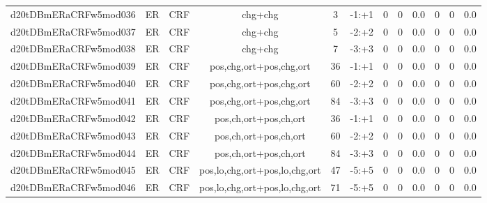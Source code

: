 \documentclass[a4paper]{article}
\begin{document}
\begin{landscape}
\begin{center}
\begin{tabular}{ |c|c|c|c|c|c|c|c|c|c|c|c|}
 
 	
 	\small{ d20tDBmERaCRFw5mod036 } & ER & CRF & chg+chg  &  3 &  -1:+1  &  0 & 0 & 0.0  &  0 & 0 & 0.0 \\
 	

 
 	
 	\small{ d20tDBmERaCRFw5mod037 } & ER & CRF & chg+chg  &  5 &  -2:+2  &  0 & 0 & 0.0  &  0 & 0 & 0.0 \\
 	

 
 	
 	\small{ d20tDBmERaCRFw5mod038 } & ER & CRF & chg+chg  &  7 &  -3:+3  &  0 & 0 & 0.0  &  0 & 0 & 0.0 \\
 	

 
 	
 	\small{ d20tDBmERaCRFw5mod039 } & ER & CRF & pos,chg,ort+pos,chg,ort  &  36 &  -1:+1  &  0 & 0 & 0.0  &  0 & 0 & 0.0 \\
 	

 
 	
 	\small{ d20tDBmERaCRFw5mod040 } & ER & CRF & pos,chg,ort+pos,chg,ort  &  60 &  -2:+2  &  0 & 0 & 0.0  &  0 & 0 & 0.0 \\
 	

 
 	
 	\small{ d20tDBmERaCRFw5mod041 } & ER & CRF & pos,chg,ort+pos,chg,ort  &  84 &  -3:+3  &  0 & 0 & 0.0  &  0 & 0 & 0.0 \\
 	

 
 	
 	\small{ d20tDBmERaCRFw5mod042 } & ER & CRF & pos,ch,ort+pos,ch,ort  &  36 &  -1:+1  &  0 & 0 & 0.0  &  0 & 0 & 0.0 \\
 	

 
 	
 	\small{ d20tDBmERaCRFw5mod043 } & ER & CRF & pos,ch,ort+pos,ch,ort  &  60 &  -2:+2  &  0 & 0 & 0.0  &  0 & 0 & 0.0 \\
 	

 
 	
 	\small{ d20tDBmERaCRFw5mod044 } & ER & CRF & pos,ch,ort+pos,ch,ort  &  84 &  -3:+3  &  0 & 0 & 0.0  &  0 & 0 & 0.0 \\
 	

 
 	
 	\small{ d20tDBmERaCRFw5mod045 } & ER & CRF & pos,lo,chg,ort+pos,lo,chg,ort  &  47 &  -5:+5  &  0 & 0 & 0.0  &  0 & 0 & 0.0 \\
 	

 
 	
 	\small{ d20tDBmERaCRFw5mod046 } & ER & CRF & pos,lo,chg,ort+pos,lo,chg,ort  &  71 &  -5:+5  &  0 & 0 & 0.0  &  0 & 0 & 0.0 \\
 	


\end{tabular}
\end{center}
\end{landscape}
\end{document}
